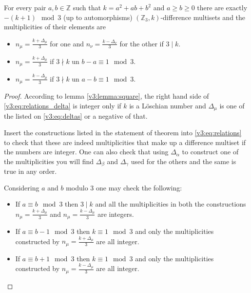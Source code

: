     \begin{theorem}
        \label{v3:theorem:loeschian}
        For every pair $a,b \in \mathbb Z$ such that $k=a^2+ab+b^2$ and $a \geq b \geq 0$ there are exactly $-(k+1) \mod 3$ (up to automorphisms) $(\mathbb Z_3,k)$-difference multisets and the multiplicities of their elements are
        
        \begin{itemize}
            \item $n_\mu=\frac{k+\Delta_\mu}{3}$ for one and $n_\nu=\frac{k-\Delta_\nu}{3}$ for the other if $3 \mid k$.
            \item $n_\mu=\frac{k+\Delta_\mu}{3}$ if $3 \nmid k$ un $b-a \equiv 1 \mod 3$.
            \item $n_\mu=\frac{k-\Delta_\mu}{3}$ if $3 \nmid k$ un $a-b \equiv 1 \mod 3$.
        \end{itemize}
    \end{theorem}

    \begin{proof}
        According to lemma \ref{v3:lemma:square}, the right hand side of \eqref{v3:eq:relations_delta} is integer only if $k$ is a Löschian number and $\Delta_\mu$ is one of the listed on \eqref{v3:eq:deltas} or a negative of that.
        
        Insert the constructions listed in the statement of theorem into \eqref{v3:eq:relations} to check that these are indeed multiplicities that make up a difference multiset if the numbers are integer. One can also check that using $\Delta_\alpha$ to construct one of the multiplicities you will find $\Delta_\beta$ and $\Delta_\gamma$ used for the others and the same is true in any order.
        
        Considering $a$ and $b$ modulo $3$ one may check the following:
        \begin{itemize}
            \item If $a \equiv b \mod 3$ then $3 \mid k$ and all the multiplicities in both the constructions $n_\mu=\frac{k+\Delta_\mu}{3}$ and $n_\mu=\frac{k-\Delta_\mu}{3}$ are integers.
            \item If $a \equiv b-1 \mod 3$ then $k \equiv 1 \mod 3$ and only the multiplicities constructed by $n_\mu=\frac{k+\Delta_\mu}{3}$ are all integer.
            \item If $a \equiv b+1 \mod 3$ then $k \equiv 1 \mod 3$ and only the multiplicities constructed by $n_\mu=\frac{k-\Delta_\mu}{3}$ are all integer.
        \end{itemize}
    \end{proof}

